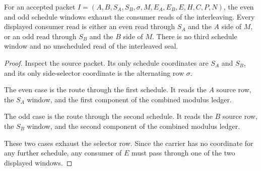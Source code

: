 \begin{theorem}
\label{thm:regular-cauchy-interleaving-schedule-window-coverage}
For an accepted packet $I=(A,B,S_A,S_B,\sigma,M,E_A,E_B,E,H,C,P,N)$, the even and odd schedule windows exhaust the consumer reads of the interleaving. Every displayed consumer read is either an even read through $S_A$ and the $A$ side of $M$, or an odd read through $S_B$ and the $B$ side of $M$. There is no third schedule window and no unscheduled read of the interleaved seal.
\end{theorem}
\begin{proof}
Inspect the source packet. Its only schedule coordinates are $S_A$ and $S_B$, and its only side-selector coordinate is the alternating row $\sigma$.

The even case is the route through the first schedule. It reads the $A$ source row, the $S_A$ window, and the first component of the combined modulus ledger.

The odd case is the route through the second schedule. It reads the $B$ source row, the $S_B$ window, and the second component of the combined modulus ledger.

These two cases exhaust the selector row. Since the carrier has no coordinate for any further schedule, any consumer of $E$ must pass through one of the two displayed windows.
\end{proof}

